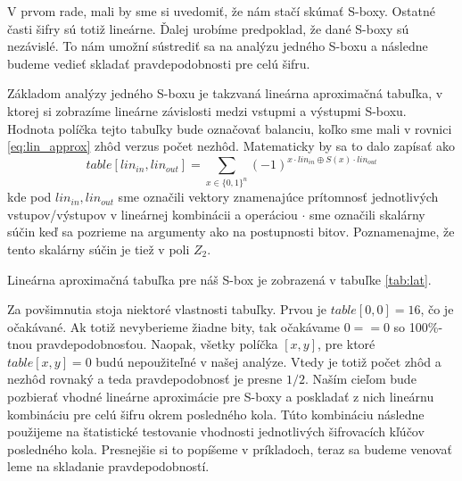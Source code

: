 V prvom rade, mali by sme si
uvedomiť, že nám stačí skúmať S-boxy. Ostatné časti šifry sú totiž
lineárne. Ďalej urobíme predpoklad, že dané S-boxy sú nezávislé. To
nám umožní sústrediť sa na analýzu jedného S-boxu a následne budeme
vedieť skladať pravdepodobnosti pre celú šifru.

Základom analýzy jedného S-boxu je takzvaná lineárna aproximačná
tabuľka, v ktorej si zobrazíme lineárne závislosti medzi vstupmi a
výstupmi S-boxu.
Hodnota políčka tejto tabuľky bude označovať balanciu,
koľko sme mali v rovnici \ref{eq:lin_approx} zhôd verzus počet nezhôd.
Matematicky by sa to dalo zapísať ako
\begin{equation*}
    table[lin_{in},lin_{out}] = \sum_{x \in \{0,1\}^n} (-1)^{
        x \cdot lin_{in} \oplus S(x) \cdot lin_{out}}
\end{equation*}
kde pod $lin_{in},lin_{out}$ sme označili vektory znamenajúce
prítomnosť jednotlivých vstupov/výstupov v lineárnej kombinácii
a operáciou $\cdot$ sme označili skalárny súčin keď sa pozrieme na
argumenty ako na postupnosti bitov. Poznamenajme, že tento skalárny
súčin je tiež v poli $Z_2$.

Lineárna aproximačná tabuľka pre náš S-box je zobrazená v tabuľke
\ref{tab:lat}.


Za povšimnutia stoja niektoré vlastnosti tabuľky. Prvou je
$table[0,0] = 16$, čo je očakávané. Ak totiž nevyberieme žiadne bity,
tak očakávame $0==0$ so 100\%-tnou pravdepodobnosťou.
Naopak, všetky políčka $[x,y]$, pre ktoré $table[x,y]=0$ budú
nepoužiteľné v našej analýze. Vtedy je totiž počet zhôd a nezhôd
rovnaký a teda pravdepodobnosť je presne $1/2$. Naším cieľom bude
pozbierať vhodné lineárne aproximácie pre S-boxy a poskladať z nich
lineárnu kombináciu pre celú šifru okrem posledného kola.
Túto kombináciu následne použijeme na štatistické testovanie
vhodnosti jednotlivých šifrovacích kľúčov posledného kola. Presnejšie
si to popíšeme v príkladoch, teraz sa budeme venovať leme na skladanie
pravdepodobností.

\begin{lema}
\end{lema}


